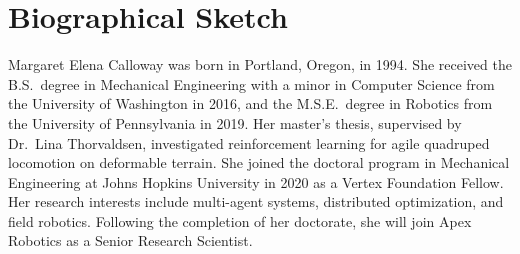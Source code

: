 \chapter*{Biographical Sketch}
{}

Margaret Elena Calloway was born in Portland, Oregon, in 1994. She received
the B.S.\ degree in Mechanical Engineering with a minor in Computer Science
from the University of Washington in 2016, and the M.S.E.\ degree in Robotics
from the University of Pennsylvania in 2019. Her master's thesis, supervised
by Dr.\ Lina Thorvaldsen, investigated reinforcement learning for agile
quadruped locomotion on deformable terrain. She joined the doctoral program
in Mechanical Engineering at Johns Hopkins University in 2020 as a Vertex
Foundation Fellow. Her research interests include multi-agent systems,
distributed optimization, and field robotics. Following the completion of
her doctorate, she will join Apex Robotics as a Senior Research Scientist.
